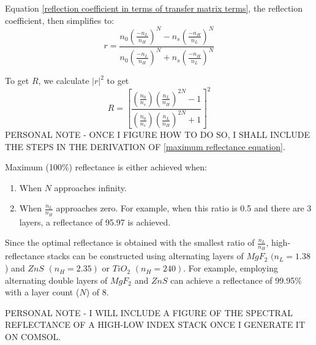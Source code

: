 Equation \ref{reflection coefficient in terms of transfer matrix terms}, the reflection coefficient, then simplifies to:
    \begin{equation}\label{reflection coefficient for double high-reflectance layers}
    r = \frac{n_0\left(\frac{-n_L}{n_H}\right)^N - n_s\left(\frac{-n_H}{n_L}\right)^N}{n_0\left(\frac{-n_L}{n_H}\right)^N + n_s\left(\frac{-n_H}{n_L}\right)^N}
    \end{equation}

To get $R$, we calculate $|r|^2$ to get
    \begin{equation}\label{maximum reflectance equation}
    R = \left[ \frac{ \left( \frac{n_0}{n_s} \right) \left( \frac{n_L}{n_H} \right)^{2N}  - 1 }{  \left( \frac{n_0}{n_s} \right) \left( \frac{n_L}{n_H} \right)^{2N}  + 1     }  \right]^2
    \end{equation}
PERSONAL NOTE - ONCE I FIGURE HOW TO DO SO, I SHALL INCLUDE THE STEPS IN THE DERIVATION OF \ref{maximum reflectance equation}.

Maximum (100\%) reflectance is either achieved when:
    \begin{enumerate}
      \item When $N$ approaches infinity.
      \item When $\frac{n_L}{n_H}$ approaches zero. For example, when this ratio is 0.5 and there are 3 layers, a reflectance of 95.97 is achieved.
    \end{enumerate}
Since the optimal reflectance is obtained with the smallest ratio of $\frac{n_L}{n_H}$, high-reflectance stacks can be constructed using alternating layers of $MgF_2$ $(n_L = 1.38$) and $ZnS$ $(n_H = 2.35)$ or $TiO_2$ $(n_H = 240)$. For example, employing alternating double layers of $MgF_2$ and $ZnS$ can achieve a reflectance of 99.95\% with a layer count ($N$) of 8. %

PERSONAL NOTE - I WILL INCLUDE A FIGURE OF THE SPECTRAL REFLECTANCE OF A HIGH-LOW INDEX STACK ONCE I GENERATE IT ON COMSOL.
